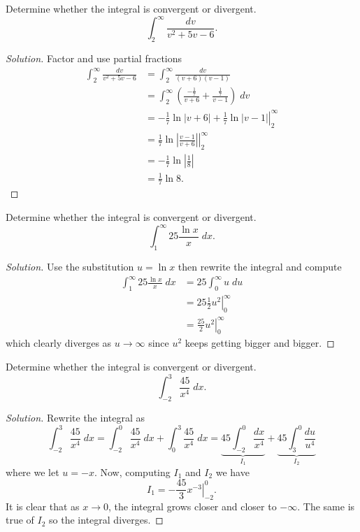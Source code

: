 \begin{problem}[WebAssign, HW 16, \# 6]
Determine whether the integral is convergent or divergent.
\[
\int_2^\infty\frac{dv}{v^2+5v-6}.
\]
\end{problem}
\begin{proof}[Solution]
Factor and use partial fractions
\begin{align*}
\int_2^\infty\frac{dv}{v^2+5v-6}
&=\int_2^\infty\frac{dv}{(v+6)(v-1)}\\
&=\int_2^{\infty}\left(\frac{-\frac{1}{7}}{v+6}+\frac{\frac{1}{7}}{v-1}\right)\;dv\\
&=\left.-\frac{1}{7}\ln|v+6|+\frac{1}{7}\ln|v-1|\right|_2^\infty\\
&=\left.\frac{1}{7}\ln\left|\frac{v-1}{v+6}\right|\right|_2^\infty\\
&=-\frac{1}{7}\ln\left|\frac{1}{8}\right|\\
&=\boxed{\frac{1}{7}\ln 8.}
\end{align*}
\end{proof}

\begin{problem}[WebAssign, HW 16, \# 7]
Determine whether the integral is convergent or divergent.
\[
\int_1^\infty 25\frac{\ln x}{x}\;dx.
\]
\end{problem}
\begin{proof}[Solution]
Use the substitution $u=\ln x$ then rewrite the integral and compute
\begin{align*}
\int_1^\infty 25\frac{\ln x}{x}\;dx
&=25\int_0^\infty u\;du\\
&=25\left.\frac{1}{2}u^2\right|_0^\infty\\
&=\frac{25}{2}\left.u^2\right|_0^\infty
\end{align*}
which clearly diverges as $u\to\infty$ since $u^2$ keeps getting bigger and
bigger.
\end{proof}

\begin{problem}[WebAssign, HW 16, \# 8]
Determine whether the integral is convergent or divergent.
\[
\int_{-2}^3\frac{45}{x^4}\;dx.
\]
\end{problem}
\begin{proof}[Solution]
Rewrite the integral as
\[
\int_{-2}^3\frac{45}{x^4}\;dx=
\int_{-2}^0\frac{45}{x^4}\;dx+\int_0^3\frac{45}{x^4}\;dx=
\underbrace{45\int_{-2}^0\frac{dx}{x^4}}_{I_1}+\underbrace{45\int_3^0\frac{du}{u^4}}_{I_2}
\]
where we let $u=-x$. Now, computing $I_1$ and $I_2$ we have
\[
I_1=-\frac{45}{3}\left.x^{-3}\right|_{-2}^0.
\]
It is clear that as $x\to 0$, the integral grows closer and closer to
$-\infty$. The same is true of $I_2$ so the integral diverges.
\end{proof}

